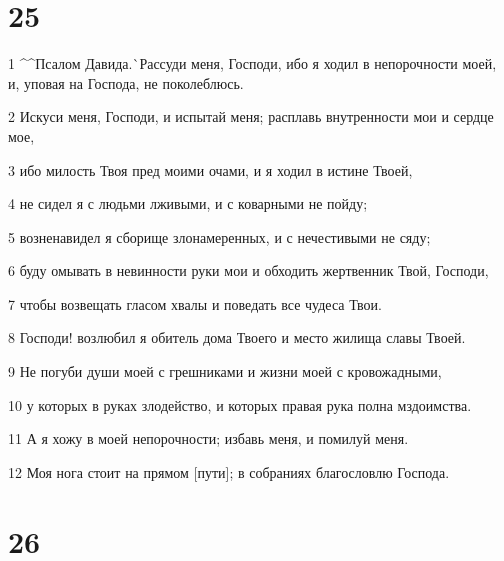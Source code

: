 \chapter{25}

\par 1 ^^Псалом Давида.^^ Рассуди меня, Господи, ибо я ходил в непорочности моей, и, уповая на Господа, не поколеблюсь.
\par 2 Искуси меня, Господи, и испытай меня; расплавь внутренности мои и сердце мое,
\par 3 ибо милость Твоя пред моими очами, и я ходил в истине Твоей,
\par 4 не сидел я с людьми лживыми, и с коварными не пойду;
\par 5 возненавидел я сборище злонамеренных, и с нечестивыми не сяду;
\par 6 буду омывать в невинности руки мои и обходить жертвенник Твой, Господи,
\par 7 чтобы возвещать гласом хвалы и поведать все чудеса Твои.
\par 8 Господи! возлюбил я обитель дома Твоего и место жилища славы Твоей.
\par 9 Не погуби души моей с грешниками и жизни моей с кровожадными,
\par 10 у которых в руках злодейство, и которых правая рука полна мздоимства.
\par 11 А я хожу в моей непорочности; избавь меня, и помилуй меня.
\par 12 Моя нога стоит на прямом [пути]; в собраниях благословлю Господа.

\chapter{26}


